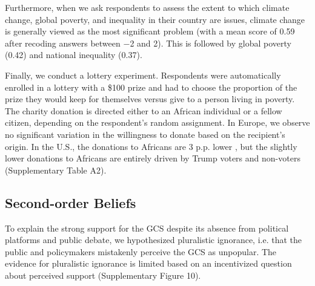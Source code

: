 Furthermore, when we ask respondents to assess the extent to which climate change, global poverty, and inequality in their country are issues, climate change is generally viewed as the most significant problem (with a mean score of 0.59 after recoding answers between $-$2 and 2). This is followed by global poverty (0.42) and national inequality (0.37). %

Finally, we conduct a lottery experiment. %
Respondents were automatically enrolled in a lottery with a \$100 prize and had to choose the proportion of the prize they would keep for themselves versus give to a person living in poverty. The charity donation is directed either to an African individual or a fellow citizen, depending on the respondent's random assignment. In Europe, we observe no significant variation in the willingness to donate based on the recipient's origin. In the U.S., the donations to Africans are 3 p.p. lower%
, but the slightly lower donations to Africans are entirely driven by Trump voters and non-voters (Supplementary Table A2). 


\subsection*{Second-order Beliefs}\label{subsec:second_order_beliefs}
To explain the strong support for the GCS despite its absence from political platforms and public debate, we hypothesized pluralistic ignorance, i.e. that the public and policymakers mistakenly perceive the GCS as unpopular. 
The evidence for pluralistic ignorance is limited based on an incentivized question about perceived support (Supplementary Figure 10).

